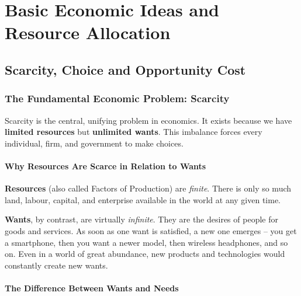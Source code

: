 \documentclass[11pt, a4paper, twoside]{book}
\begin{document}
\pagestyle{fancy}
\setcounter{tocdepth}{2}
\hypertarget{toc}{}
{\color{NavyPrimary}
\tableofcontents
}
\clearpage


\chapter{Basic Economic Ideas and Resource Allocation}

\section{Scarcity, Choice and Opportunity Cost}



\subsection{The Fundamental Economic Problem: Scarcity}

\begin{coreidea}
Scarcity is the central, unifying problem in economics. It exists because we have \textbf{limited resources} but \textbf{unlimited wants}. This imbalance forces every individual, firm, and government to make choices.
\end{coreidea}

\subsubsection{Why Resources Are Scarce in Relation to Wants}

\textbf{Resources} (also called Factors of Production) are \emph{finite}. There is only so much land, labour, capital, and enterprise available in the world at any given time.

\textbf{Wants}, by contrast, are virtually \emph{infinite}. They are the desires of people for goods and services. As soon as one want is satisfied, a new one emerges -- you get a smartphone, then you want a newer model, then wireless headphones, and so on. Even in a world of great abundance, new products and technologies would constantly create new wants.

\subsubsection{The Difference Between Wants and Needs}
\end{document}

